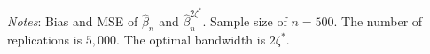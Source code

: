 \documentclass[12pt,fleqn]{article}
\theoremstyle{definition}
\newcommand{\wh}{\widehat}
\newcommand{\hROT}{\zeta^*}
\begin{document}
\begin{sidewaystable}[!htbp]
\begin{adjustbox}{scale=0.99,right}
\begin{threeparttable}
\begin{tablenotes}
\scriptsize
\item \textit{Notes}: Bias and MSE of $\wh{\beta}_{n}$ and $\wh{\beta}_{n}^{2\hROT}$. Sample size of $n=500$. The number of replications is $5,000$. The optimal bandwidth is $2\hROT$.
\end{tablenotes}
\end{threeparttable}
\end{adjustbox}
\end{sidewaystable}  
\end{document}

